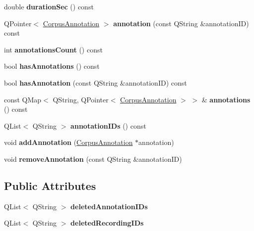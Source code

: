 \begin{DoxyCompactItemize}
double {\bfseries duration\+Sec} () const
\item 
\mbox{\label{class_corpus_communication_a6e8c3fab9c1e84382613788afa1ad892}} 
Q\+Pointer$<$ \hyperlink{class_corpus_annotation}{Corpus\+Annotation} $>$ {\bfseries annotation} (const Q\+String \&annotation\+ID) const
\item 
\mbox{\label{class_corpus_communication_a97b5bf826b319808d100759d3b63daf1}} 
int {\bfseries annotations\+Count} () const
\item 
\mbox{\label{class_corpus_communication_aec4ab5d693d36a628a3ff3800a1cb2fa}} 
bool {\bfseries has\+Annotations} () const
\item 
\mbox{\label{class_corpus_communication_a5de9631605419702088875b668b2ed4e}} 
bool {\bfseries has\+Annotation} (const Q\+String \&annotation\+ID) const
\item 
\mbox{\label{class_corpus_communication_a39033d3c365366cd7e687472187297bc}} 
const Q\+Map$<$ Q\+String, Q\+Pointer$<$ \hyperlink{class_corpus_annotation}{Corpus\+Annotation} $>$ $>$ \& {\bfseries annotations} () const
\item 
\mbox{\label{class_corpus_communication_a82456aa4a74824e65ca2c5607658871e}} 
Q\+List$<$ Q\+String $>$ {\bfseries annotation\+I\+Ds} () const
\item 
\mbox{\label{class_corpus_communication_a8761cb30f9108b257793c9035e71cbe2}} 
void {\bfseries add\+Annotation} (\hyperlink{class_corpus_annotation}{Corpus\+Annotation} $\ast$annotation)
\item 
\mbox{\label{class_corpus_communication_a73cafc4b999510036f2e2417a51f25c8}} 
void {\bfseries remove\+Annotation} (const Q\+String \&annotation\+ID)
\end{DoxyCompactItemize}
\subsection*{Public Attributes}
\begin{DoxyCompactItemize}
\item 
\mbox{\label{class_corpus_communication_a1a79b5e97057886b29ea41f1752f49ad}} 
Q\+List$<$ Q\+String $>$ {\bfseries deleted\+Annotation\+I\+Ds}
\item 
\mbox{\label{class_corpus_communication_a7ace8bca02f7247ae54dba95fb2024bd}} 
Q\+List$<$ Q\+String $>$ {\bfseries deleted\+Recording\+I\+Ds}
\end{DoxyCompactItemize}
